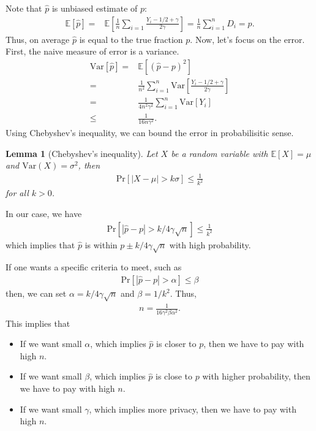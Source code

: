 \documentclass[11pt, a4paper]{article}
\newtheorem{lemma}{Lemma}
\begin{document}
Note that $\hat{p}$ is unbiased estimate of $p$:
\begin{align}
    \mathbb{E}[\hat{p}] =& \mathbb{E}\left[\frac{1}{n}\sum_{i=1}\frac{Y_i - 1/2 + \gamma}{2\gamma}\right] = \frac{1}{n} \sum_{i=1}^n D_i = p.
\end{align}
Thus, on average $\hat{p}$ is equal to the true fraction $p$.
Now, let's focus on the error.
First, the naive measure of error is a variance.
\begin{align}
    \mbox{Var}[\hat{p}] =& \mathbb{E}[(\hat{p}-p)^2] \\
    =& \frac{1}{n^2} \sum_{i=1}^n \mbox{Var}\left[\frac{Y_i -1/2+\gamma}{2\gamma}\right]\\
    =& \frac{1}{4n^2\gamma^2} \sum_{i=1}^n \mbox{Var}\left[Y_i\right]\\
    \leq& \frac{1}{16n\gamma^2}.
\end{align}
Using Chebyshev's inequality, we can bound the error in probabilisitic sense.
\begin{lemma}[Chebyshev's inequality]
    Let $X$ be a random variable with $\mathbb{E}[X] = \mu$ and $\mbox{Var}(X) = \sigma^2$, then
    \begin{align}
        \mbox{Pr}[|X-\mu| > k \sigma] \leq \frac{1}{k^2}
    \end{align}
    for all $k>0$.
\end{lemma}
In our case, we have
\begin{align}
        \mbox{Pr}[|\hat{p}-p| > k /4\gamma\sqrt{n}] \leq \frac{1}{k^2}
\end{align}
which implies that $\hat{p}$ is within $p \pm k/4\gamma\sqrt{n}$ with high probability.

If one wants a specific criteria to meet, such as
\begin{align}
        \mbox{Pr}[|\hat{p}-p| > \alpha] \leq \beta
\end{align}
then, we can set $\alpha = k/4\gamma\sqrt{n}$ and $\beta = 1/k^2$.
Thus,
\begin{align}
    n = \frac{1}{16\gamma^2\beta\alpha^2}.
\end{align}
This implies that
\begin{itemize}
    \item  If we want small $\alpha$, which implies $\hat{p}$ is closer to $p$, then we have to pay with high $n$.
    \item  If we want small $\beta$, which implies $\hat{p}$ is close to $p$ with higher probability, then we have to pay with high $n$.
    \item  If we want small $\gamma$, which implies more privacy, then we have to pay with high $n$.
\end{itemize}
\end{document}
